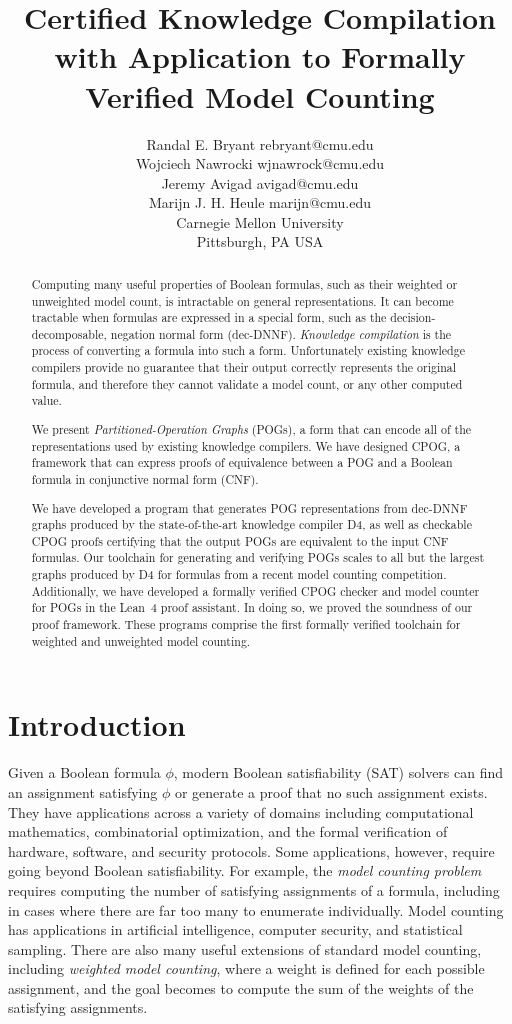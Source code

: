 \documentclass[twoside,11pt]{article}
\title{Certified Knowledge Compilation \\ with Application to Formally Verified Model Counting}
\author{\name Randal E. Bryant \email rebryant@cmu.edu \\
  \name Wojciech Nawrocki \email wjnawrock@cmu.edu \\
  \name Jeremy Avigad \email avigad@cmu.edu \\
  \name Marijn J. H. Heule \email marijn@cmu.edu \\
  \addr Carnegie Mellon University \\ Pittsburgh, PA  USA}
\newcommand{\progname}[1]{\textsc{#1}}
\newcommand{\dfour}{\progname{D4}}
\newcommand{\lean}{Lean~4}
\begin{document}
\maketitle

\begin{abstract}

Computing many useful properties of Boolean formulas, such as their weighted or unweighted model count,
is intractable on general representations. It can become tractable when formulas are expressed in a
special form, such as the decision-decomposable, negation normal form (dec-DNNF)\@.
\emph{Knowledge compilation} is the process of converting a formula
into such a form. Unfortunately existing knowledge compilers provide no guarantee that their output correctly
represents the original formula, and therefore they cannot validate a model count, or any other computed value.

We present \emph{Partitioned-Operation Graphs} (POGs), a form that can
encode all
of the representations used by existing knowledge compilers.
We have designed  CPOG, a framework that can express proofs of equivalence between a
POG  and a Boolean formula in conjunctive normal form (CNF).

We have developed a program that generates POG representations from dec-DNNF
graphs
produced by the state-of-the-art knowledge compiler
\dfour{}, as well as checkable CPOG proofs certifying that the output POGs
are equivalent to the input CNF formulas.  Our toolchain
for generating and verifying POGs scales to all but the largest
graphs produced by \dfour{} for formulas from a recent model counting
competition. Additionally, we have developed a formally verified CPOG
checker and model counter for POGs in the \lean{} proof assistant.
In doing so, we proved the soundness of our proof framework. These programs
comprise the first formally verified toolchain for weighted and unweighted
model counting.
\end{abstract}

\section{Introduction}

Given a Boolean formula $\phi$, modern Boolean satisfiability (SAT) solvers can
find an assignment satisfying $\phi$ or generate a proof that no
such assignment exists.  They have applications across a variety of
domains including computational mathematics, combinatorial
optimization, and the formal verification of hardware, software, and
security protocols.  Some applications, however, require going
beyond Boolean satisfiability.  For example, the \emph{model
  counting problem} requires computing the number of satisfying
assignments of a formula, including in cases where there are far too many
to enumerate individually.  Model counting has
applications in artificial intelligence, computer security, and
statistical sampling.  There are also many useful extensions of standard model counting,
including {\em
  weighted model counting}, where a weight is defined for
each possible assignment, and the goal becomes to compute the sum of the weights
of the satisfying assignments.
\end{document}
